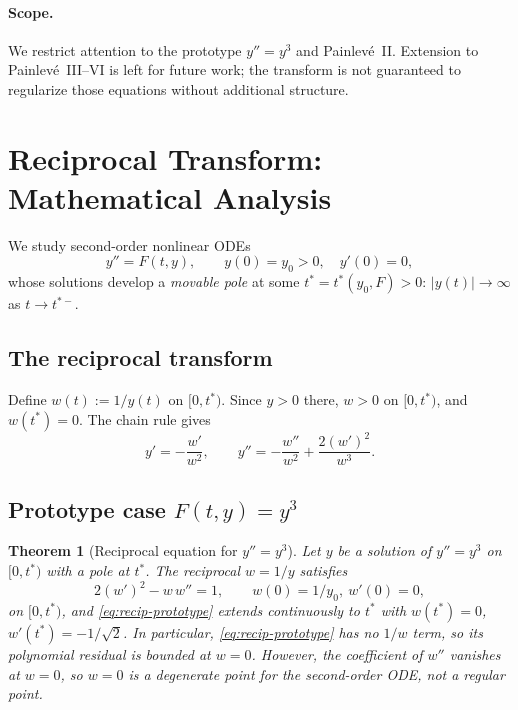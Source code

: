 \documentclass[11pt,a4paper]{article}
\newtheorem{theorem}{Theorem}
\theoremstyle{definition}
\begin{document}
\paragraph{Scope.}
We restrict attention to the prototype $y''=y^3$ and Painlev\'e~II.
Extension to Painlev\'e~III--VI is left for future work; the
transform is not guaranteed to regularize those equations without
additional structure.

\section{Reciprocal Transform: Mathematical Analysis}
\label{sec:theory}

We study second-order nonlinear ODEs
\begin{equation}
y'' = F(t, y), \qquad y(0)=y_0>0,\quad y'(0)=0,
\label{eq:generic}
\end{equation}
whose solutions develop a \emph{movable pole} at some
$t^* = t^*(y_0, F) > 0$: $|y(t)| \to \infty$ as $t \to t^{*-}$.

\subsection{The reciprocal transform}

Define $w(t) := 1/y(t)$ on $[0, t^*)$. Since $y > 0$ there,
$w > 0$ on $[0, t^*)$, and $w(t^*) = 0$. The chain rule gives
\begin{equation}
y' = -\frac{w'}{w^2}, \qquad
y'' = -\frac{w''}{w^2} + \frac{2(w')^2}{w^3}.
\label{eq:chain}
\end{equation}

\subsection{Prototype case $F(t,y) = y^3$}

\begin{theorem}[Reciprocal equation for $y''=y^3$]
\label{thm:prototype}
Let $y$ be a solution of $y''=y^3$ on $[0,t^*)$ with a pole at $t^*$.
The reciprocal $w = 1/y$ satisfies
\begin{equation}
2(w')^2 - w\,w'' = 1, \qquad w(0) = 1/y_0,\ w'(0)=0,
\label{eq:recip-prototype}
\end{equation}
on $[0,t^*)$, and \eqref{eq:recip-prototype} extends continuously to
$t^*$ with $w(t^*)=0$, $w'(t^*) = -1/\sqrt{2}$. In particular, \eqref{eq:recip-prototype} has no $1/w$ term, so its polynomial residual is bounded at $w=0$. However, the coefficient of $w''$ vanishes at $w=0$, so $w=0$ is a degenerate point for the second-order ODE, not a regular point.
\end{theorem}
\end{document}
